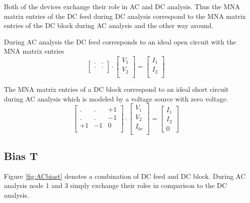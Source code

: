 Both of the devices exchange their role in AC and DC analysis.  Thus
the MNA matrix entries of the DC feed during DC analysis correspond to
the MNA matrix entries of the DC block during AC analysis and the
other way around.

\addvspace{12pt}

During AC analysis the DC feed corresponds to an ideal open circuit
with the MNA matrix entries
\begin{equation}
\begin{bmatrix}
. & .\\
. & .\\
\end{bmatrix}
\cdot
\begin{bmatrix}
V_1\\
V_2\\
\end{bmatrix}
=
\begin{bmatrix}
I_1\\
I_2\\
\end{bmatrix}
\end{equation}

The MNA matrix entries of a DC block correspond to an ideal short
circuit during AC analysis which is modeled by a voltage source with
zero voltage.
\begin{equation}
\begin{bmatrix}
. & . & +1\\
. & . & -1\\
+1 & -1 & 0\\
\end{bmatrix}
\cdot
\begin{bmatrix}
V_1\\
V_2\\
I_{br}\\
\end{bmatrix}
=
\begin{bmatrix}
I_1\\
I_2\\
0
\end{bmatrix}
\end{equation}

\subsection{Bias T}

Figure \ref{fig:ACbiast} denotes a combination of DC feed and DC
block.  During AC analysis node 1 and 3 simply exchange their roles in
comparison to the DC analysis.

